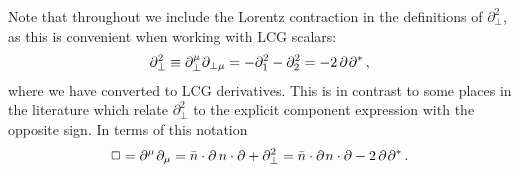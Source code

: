 \documentclass[12pt,document,nofootinbib,superscriptaddress,onecolumn,preprintnumbers,balancelastpage]{article}
\newcommand{\s}{\hspace{0.8pt}}
\newcommand{\bea}{\begin{eqnarray}}
\newcommand{\eea}{\end{eqnarray}}
\newcommand{\nbp}{\bar{n}\cdot \partial}
\newcommand{\np}{n\cdot \partial}
\begin{document}
Note that throughout we include the Lorentz contraction in the definitions of $\partial_\perp^2$, as this is convenient when working with LCG scalars:
\bea
\partial_\perp^2 \equiv \partial_\perp^\mu \partial_{\perp \mu}  = - \partial_1^2 - \partial_2^2  = - 2\, \partial\s \partial^* \, ,
\eea
where we have converted to LCG derivatives.
%
This is in contrast to some places in the literature which relate $\partial_\perp^2$ to the explicit component expression with the opposite sign.
%
In terms of this notation 
\bea
\Box = \partial^\mu\s \partial_\mu = \nbp \,\np + \partial_\perp^2 = \nbp \s\np - 2\, \partial\s \partial^* \,.
\eea

\begin{spacing}{1.1}
% 


\end{spacing}
\end{document}
